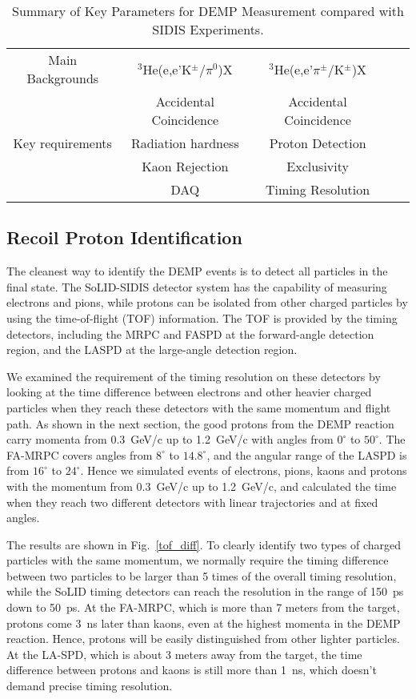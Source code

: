 \begin{table}
\begin{tabular}{|c|c|c|c|c|}
Main Backgrounds           & $\mathrm{^{3}He}$(e,e'K$^\pm$/$\pi^{0}$)X            &$\mathrm{^{3}He}$(e,e'$\pi^{\pm}$/K$^\pm$)X  \\
                           &   Accidental Coincidence & Accidental Coincidence	\\\hline
Key requirements           &  Radiation hardness      & Proton Detection	\\
                           &  Kaon Rejection          & Exclusivity	\\
                           &  DAQ                     &    Timing Resolution   \\
                        \hline
\end{tabular}
\caption{\footnotesize{Summary of Key Parameters for DEMP Measurement compared
    with SIDIS Experiments.}}\label{table:program_summary}
\label{table:key_par_sidis_dvcs}
\end{table} 

\subsection{Recoil Proton Identification
\label{sec:proton_ID}}
The cleanest way to identify the DEMP events is to detect all particles in the
final state. The SoLID-SIDIS detector system has the capability of measuring
electrons and pions, while protons can be isolated from other charged particles
by using the time-of-flight (TOF) information. The TOF is provided by the timing
detectors, including the MRPC and FASPD at the forward-angle detection region,
and the LASPD at the large-angle detection region. 

We examined the requirement of the timing resolution on these detectors by
looking at the time difference between electrons and other heavier charged
particles when they reach these detectors with the same momentum and flight
path. As shown in the next section, the good protons from the DEMP reaction
carry momenta from 0.3~GeV/c up to 1.2~GeV/c with angles from
$0^{\circ}$ to $50^{\circ}$. The FA-MRPC covers angles from
$8^{\circ}$ to $14.8^{\circ}$, and the angular range of the LASPD is from
$16^{\circ}$ to $24^{\circ}$.  Hence we simulated
events of electrons, pions, kaons and protons with the momentum from
0.3~GeV/c up to 1.2~GeV/c, and calculated the time when they reach two different
detectors with linear trajectories and at fixed angles.

The results are shown in Fig.~\ref{tof_diff}. To clearly identify two types of
charged particles with the same momentum, we normally require the timing
difference between two particles to be larger than 5 times of the overall
timing resolution, while the SoLID timing detectors can reach the resolution
in the range of 150~ps down to 50~ps.  At the FA-MRPC, which is more than 7
meters from the target, protons come 3~ns later than kaons, even at the highest
momenta in the DEMP reaction. Hence, protons will be easily distinguished from
other lighter particles.  At the LA-SPD, which is about 3 meters away from the
target, the time difference between protons and kaons is still more than 1~ns,
which doesn't demand precise timing resolution.

